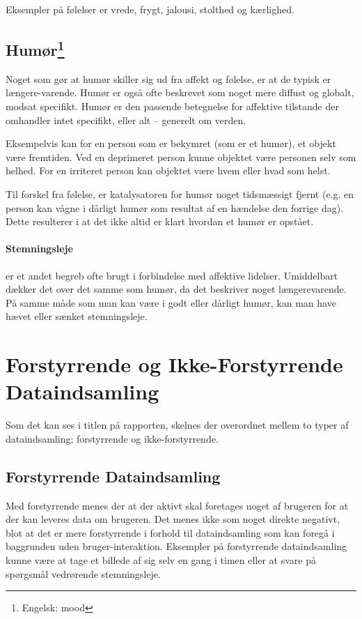 Eksempler på følelser er vrede, frygt, jalousi, stolthed og kærlighed.

\subsection[Humør]{Humør\footnote{Engelsk: mood}}
Noget som gør at humør skiller sig ud fra affekt og følelse, er at de typisk er længere-varende.
Humør er også ofte beskrevet som noget mere diffust og globalt, modsat specifikt.
Humør er den passende betegnelse for affektive tilstande der omhandler intet specifikt, eller alt -- generelt om verden.

Eksempelvis kan for en person som er bekymret (som er et humør), et objekt være fremtiden.
Ved en deprimeret person kunne objektet være personen selv som helhed.
For en irriteret person kan objektet være hvem eller hvad som helst.

Til forskel fra følelse, er katalysatoren for humør noget tidsmæssigt fjernt (e.g. en person kan vågne i dårligt humør som resultat af en hændelse den forrige dag).
Dette resulterer i at det ikke altid er klart hvordan et humør er opstået.

\paragraph{Stemningsleje} er et andet begreb ofte brugt i forbindelse med affektive lidelser.
Umiddelbart dækker det over det samme som humør, da det beskriver noget længerevarende.
På samme måde som man kan være i godt eller dårligt humør, kan man have hævet eller sænket stemningsleje.

\section{Forstyrrende og Ikke-Forstyrrende Dataindsamling}
Som det kan ses i titlen på rapporten, skelnes der overordnet mellem to typer af dataindsamling; forstyrrende og ikke-forstyrrende.

\subsection{Forstyrrende Dataindsamling}
Med forstyrrende menes der at der aktivt skal foretages noget af brugeren for at der kan leveres data om brugeren.
Det menes ikke som noget direkte negativt, blot at det er mere forstyrrende i forhold til dataindsamling som kan foregå i baggrunden uden bruger-interaktion.
Eksempler på forstyrrende dataindsamling kunne være at tage et billede af sig selv en gang i timen eller at svare på spørgsmål vedrørende stemningsleje.

